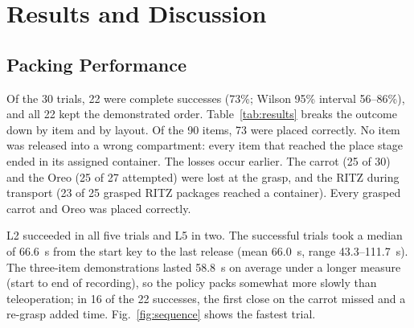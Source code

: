 \section{Results and Discussion}
\label{sec:results}

\subsection{Packing Performance}
\label{sec:performance}
Of the 30 trials, 22 were complete successes (73\%; Wilson 95\% interval
56--86\%), and all 22 kept the demonstrated order.
Table~\ref{tab:results} breaks the outcome down by item and by layout. Of the
90 items, 73 were placed correctly. No item was released into a wrong
compartment: every item that reached the place stage ended in its assigned
container. The losses occur earlier. The carrot (25 of 30) and the Oreo (25
of 27 attempted) were lost at the grasp, and the RITZ during transport (23 of
25 grasped RITZ packages reached a container). Every grasped carrot and Oreo
was placed correctly.

L2 succeeded in all five trials and L5 in two. The successful trials took a
median of 66.6~s from the start key to the last release (mean 66.0~s, range
43.3--111.7~s). The three-item demonstrations lasted 58.8~s on average under
a longer measure (start to end of recording), so the policy packs somewhat
more slowly than teleoperation; in 16 of the 22 successes, the first close on
the carrot missed and a re-grasp added time.
Fig.~\ref{fig:sequence} shows the fastest trial.

